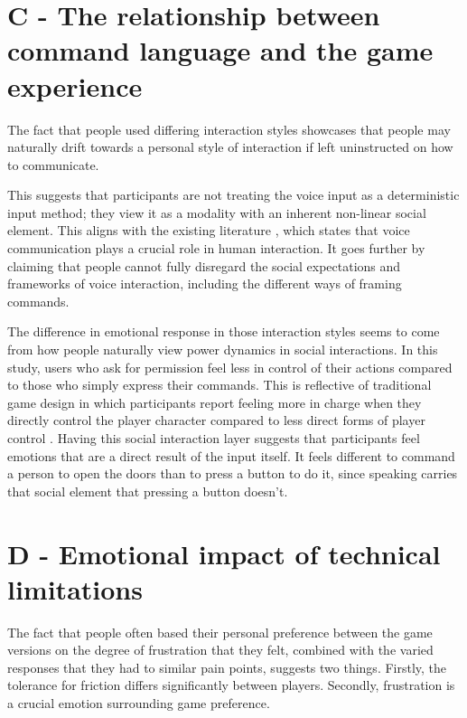 \section{C - The relationship between command language and the game experience}

The fact that people used differing interaction styles showcases that people may naturally drift towards a personal style of interaction if left uninstructed on how to communicate. 

This suggests that participants are not treating the voice input as a deterministic input method; they view it as a modality with an inherent non-linear social element. This aligns with the existing literature \parencite{interactiondesignfoundationWhatAreVoice2025}, which states that voice communication plays a crucial role in human interaction. It goes further by claiming that people cannot fully disregard the social expectations and frameworks of voice interaction, including the different ways of framing commands. 

The difference in emotional response in those interaction styles seems to come from how people naturally view power dynamics in social interactions. 
In this study, users who ask for permission feel less in control of their actions compared to those who simply express their commands. This is reflective of traditional game design in which participants report feeling more in charge when they directly control the player character compared to less direct forms of player control \parencite{kiiskiVoiceGamesHistory2020}.
Having this social interaction layer suggests that participants feel emotions that are a direct result of the input itself. It feels different to command a person to open the doors than to press a button to do it, since speaking carries that social element that pressing a button doesn't. 

\section{D - Emotional impact of technical limitations}

The fact that people often based their personal preference between the game versions on the degree of frustration that they felt, combined with the varied responses that they had to similar pain points, suggests two things. Firstly, the tolerance for friction differs significantly between players. Secondly, frustration is a crucial emotion surrounding game preference. 


